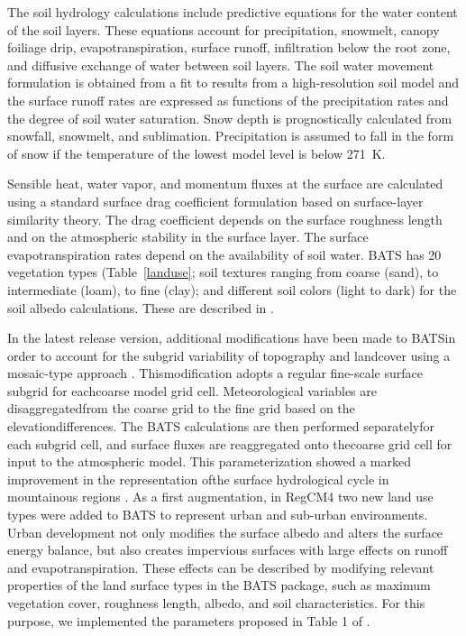 The soil hydrology calculations include predictive equations for the water
content of the soil layers.  These equations account for precipitation,
snowmelt, canopy foiliage drip, evapotranspiration, surface runoff, infiltration
below the root zone, and diffusive exchange of water between soil layers.  The
soil water movement formulation is obtained from a fit to results from a
high-resolution soil model \cite{Dickinson_84} and the surface runoff rates are
expressed as functions of the precipitation rates and the degree of soil water
saturation.  Snow depth is prognostically calculated from snowfall, snowmelt,
and sublimation.  Precipitation is assumed to fall in the form of snow if the
temperature of the lowest model level is below 271~K.

Sensible heat, water vapor, and momentum fluxes at the surface are calculated
using a standard surface drag coefficient formulation based on surface-layer
similarity theory.  The drag coefficient depends on the surface roughness length
and on the atmospheric stability in the surface layer.  The surface
evapotranspiration rates depend on the availability of soil water.  \ac{BATS}
has 20 vegetation types (Table~\ref{landuse};  soil textures ranging from coarse
(sand), to intermediate (loam), to fine (clay);  and different soil colors
(light to dark) for the soil albedo calculations.  These are described in
\cite{Dickinson_86}. 

In the latest release version, additional modifications have been made to
\ac{BATS}in order to account for the subgrid variability of topography and
landcover using a mosaic-type approach \citep{Giorgi03b}.  Thismodification
adopts a regular fine-scale surface subgrid for eachcoarse model grid cell.
Meteorological variables are disaggregatedfrom the coarse grid to the fine
grid based on the elevationdifferences.  The \ac{BATS} calculations are then
performed separatelyfor each subgrid cell, and surface fluxes are reaggregated
onto thecoarse grid cell for input to the atmospheric model.
This parameterization showed a marked improvement in the representation ofthe
surface hydrological cycle in mountainous regions \citep{Giorgi03b}.
As a first augmentation, in \ac{RegCM4} two new land use types were added to
\ac{BATS} to represent urban and sub-urban environments. Urban development not
only modifies the surface albedo and alters the surface energy balance, but
also creates impervious surfaces with large effects on runoff and
evapotranspiration.
These effects can be described by modifying relevant properties of the land
surface types in the BATS package, such as maximum vegetation cover, roughness
length, albedo, and soil characteristics. For this purpose, we implemented the
parameters proposed in Table 1 of \cite{Kueppers_08}.

